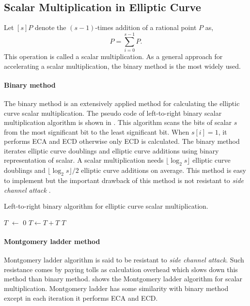 \subsection{Scalar Multiplication in Elliptic Curve}
\label{sec:chap:fund:scm}
Let $[s]P$ denote the $(s-1)$-times addition of a rational point $P$ as, 
\begin{equation}
[s]P = \sum_{i = 0}^{s-1}{P}.
\end{equation}
This operation is called a scalar multiplication.
As a general approach for accelerating a scalar multiplication, the binary method is the most widely used.

\paragraph{Binary method}
\label{sec:chap:fund:binscm}
The binary method is an extensively applied method for calculating the elliptic curve scalar multiplication. 
 The pseudo code of left-to-right binary scalar multiplication algorithm is shown in . 
 This algorithm scans the bits of scalar $s$ from the  most significant bit to the least significant bit. When $s[i] = 1$, it  performs ECA and ECD otherwise only ECD is calculated. 
 The binary method iterates elliptic curve doublings and elliptic curve additions using binary representation of scalar.
 A scalar multiplication needs $\lfloor \log_2 s\rfloor$ elliptic curve doublings and $\lfloor \log_2 s\rfloor/2$ elliptic curve additions on average.
  This method is easy to implement but the important drawback of this method is not resistant to \textit{side channel attack} \cite{C:Kocher96}.  

\begin{algorithm}[ht]
	\caption{Left-to-right binary algorithm for elliptic curve scalar multiplication.}
	\label{alg:binary_scm_chap_fundamental}
	\DontPrintSemicolon
	 $T$ $ \leftarrow$ $0$ \;
	  {\;
				$T \leftarrow T  + T$\;
		     }
	  $T$\;
\end{algorithm}

\paragraph{Montgomery ladder method}
\label{sec:chap:fund:montscm}
Montgomery ladder algorithm is said to be resistant to \textit{side channel attack}. Such resistance comes by paying tolls as calculation overhead which slows down this method than binary method.   shows the Montgomery ladder algorithm for scalar multiplication. Montgomery ladder has some similarity with binary method except in each iteration it performs ECA and ECD. 

